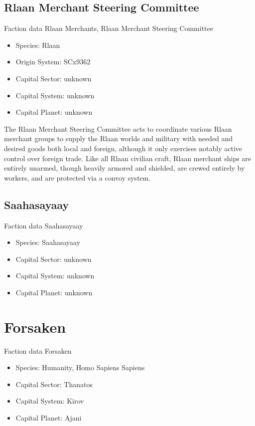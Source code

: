 \subsection{Rlaan Merchant Steering Committee}

Faction data Rlaan Merchants, Rlaan Merchant Steering Committee
\begin{itemize}
\item Species: Rlaan
\item Origin System: SCx9362
\item Capital Sector: unknown
\item Capital System: unknown
\item Capital Planet: unknown
\end{itemize}

The Rlaan Merchant Steering Committee acts to coordinate various Rlaan
merchant groups to supply the Rlaan worlds and military with needed
and desired goods both local and foreign, although it only exercises
notably active control over foreign trade. Like all Rlaan civilian
craft, Rlaan merchant ships are entirely unarmed, though heavily
armored and shielded, are crewed entirely by workers, and are
protected via a convoy system.
 
\subsection{Saahasayaay}

Faction data Saahasayaay
\begin{itemize}
\item Species: Saahasayaay
\item Capital Sector: unknown
\item Capital System: unknown
\item Capital Planet: unknown
\end{itemize}

\section{Forsaken}

Faction data Forsaken
\begin{itemize}
\item Species: Humanity, Homo Sapiens Sapiens
\item Capital Sector: Thanatos
\item Capital System: Kirov
\item Capital Planet: Ajani
\end{itemize}

